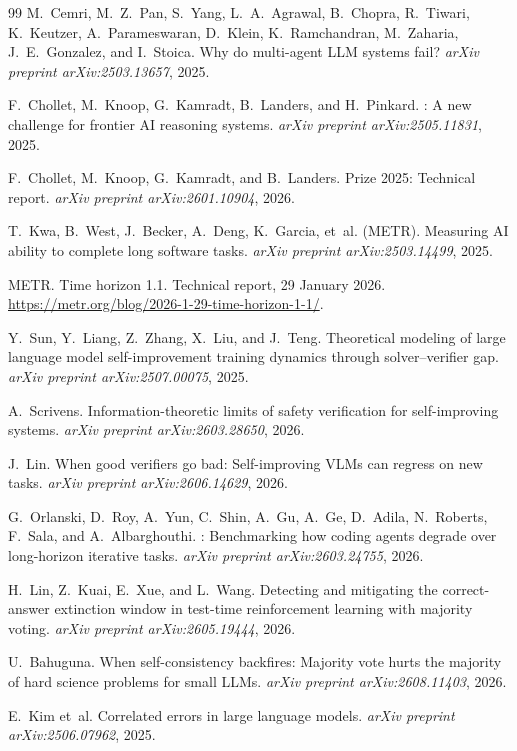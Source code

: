 \documentclass[11pt,a4paper]{article}
\begin{document}
\begin{thebibliography}{99}
M.~Cemri, M.~Z.~Pan, S.~Yang, L.~A.~Agrawal, B.~Chopra, R.~Tiwari, K.~Keutzer, A.~Parameswaran, D.~Klein, K.~Ramchandran, M.~Zaharia, J.~E.~Gonzalez, and I.~Stoica.
\newblock Why do multi-agent {LLM} systems fail?
\newblock \emph{arXiv preprint arXiv:2503.13657}, 2025.

F.~Chollet, M.~Knoop, G.~Kamradt, B.~Landers, and H.~Pinkard.
: A new challenge for frontier {AI} reasoning systems.
\newblock \emph{arXiv preprint arXiv:2505.11831}, 2025.

F.~Chollet, M.~Knoop, G.~Kamradt, and B.~Landers.
 {P}rize 2025: Technical report.
\newblock \emph{arXiv preprint arXiv:2601.10904}, 2026.

T.~Kwa, B.~West, J.~Becker, A.~Deng, K.~Garcia, et~al. (METR).
\newblock Measuring {AI} ability to complete long software tasks.
\newblock \emph{arXiv preprint arXiv:2503.14499}, 2025.

METR.
\newblock Time horizon 1.1.
\newblock Technical report, 29 January 2026.
\newblock \url{https://metr.org/blog/2026-1-29-time-horizon-1-1/}.

Y.~Sun, Y.~Liang, Z.~Zhang, X.~Liu, and J.~Teng.
\newblock Theoretical modeling of large language model self-improvement training dynamics through solver--verifier gap.
\newblock \emph{arXiv preprint arXiv:2507.00075}, 2025.

A.~Scrivens.
\newblock Information-theoretic limits of safety verification for self-improving systems.
\newblock \emph{arXiv preprint arXiv:2603.28650}, 2026.

J.~Lin.
\newblock When good verifiers go bad: Self-improving {VLM}s can regress on new tasks.
\newblock \emph{arXiv preprint arXiv:2606.14629}, 2026.

G.~Orlanski, D.~Roy, A.~Yun, C.~Shin, A.~Gu, A.~Ge, D.~Adila, N.~Roberts, F.~Sala, and A.~Albarghouthi.
: Benchmarking how coding agents degrade over long-horizon iterative tasks.
\newblock \emph{arXiv preprint arXiv:2603.24755}, 2026.

H.~Lin, Z.~Kuai, E.~Xue, and L.~Wang.
\newblock Detecting and mitigating the correct-answer extinction window in test-time reinforcement learning with majority voting.
\newblock \emph{arXiv preprint arXiv:2605.19444}, 2026.

U.~Bahuguna.
\newblock When self-consistency backfires: Majority vote hurts the majority of hard science problems for small {LLM}s.
\newblock \emph{arXiv preprint arXiv:2608.11403}, 2026.

E.~Kim et~al.
\newblock Correlated errors in large language models.
\newblock \emph{arXiv preprint arXiv:2506.07962}, 2025.

\end{thebibliography}
\end{document}
